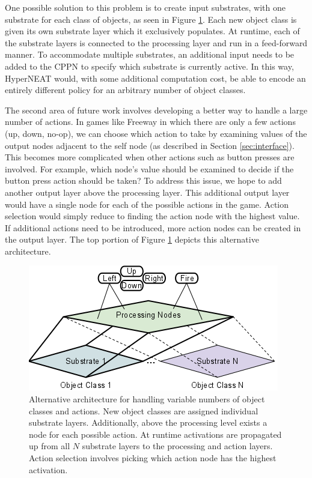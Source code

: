 \documentclass{acm_proc_article-sp}
\begin{document}
One possible solution to this problem is to create input substrates, with one substrate for each class of objects, as seen in Figure \ref{fig:possiblearch}. Each new object class is given its own substrate layer which it exclusively populates. At runtime, each of the substrate layers is connected to the processing layer and run in a feed-forward manner. To accommodate multiple substrates, an additional input needs to be added to the CPPN to specify which substrate is currently active. In this way, HyperNEAT would, with some additional computation cost, be able to encode an entirely different policy for an arbitrary number of object classes. 

The second area of future work involves developing a better way to handle a large number of actions. In games like Freeway in which there are only a few actions (up, down, no-op), we can choose which action to take by examining values of the output nodes adjacent to the self node (as described in Section \ref{sec:interface}). This becomes more complicated when other actions such as button presses are involved. For example, which node's value should be examined to decide if the button press action should be taken? To address this issue, we hope to add another output layer above the processing layer. This additional output layer would have a single node for each of the possible actions in the game. Action selection would simply reduce to finding the action node with the highest value. If additional actions need to be introduced, more action nodes can be created in the output layer. The top portion of Figure \ref{fig:possiblearch} depicts this alternative architecture.

\begin{figure}[htp]
\begin{center}
\includegraphics[width=\columnwidth]{figures/multiple-substrate.png}
\end{center}
\caption{Alternative architecture for handling variable numbers of object classes and actions. New object classes are assigned individual substrate layers. Additionally, above the processing level exists a node for each possible action. At runtime activations are propagated up from all $N$ substrate layers to the processing and action layers. Action selection involves picking which action node has the highest activation.}
\label{fig:possiblearch}
\end{figure}
\end{document}
